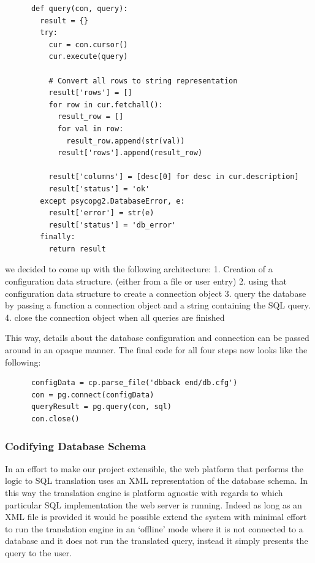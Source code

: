 \documentclass[a4paper, 11pt]{article}
\begin{document}
      \begin{verbatim}
      def query(con, query):
        result = {}
        try:
          cur = con.cursor()
          cur.execute(query)

          # Convert all rows to string representation
          result['rows'] = []
          for row in cur.fetchall():
            result_row = []
            for val in row:
              result_row.append(str(val))
            result['rows'].append(result_row)

          result['columns'] = [desc[0] for desc in cur.description]
          result['status'] = 'ok'
        except psycopg2.DatabaseError, e:
          result['error'] = str(e)
          result['status'] = 'db_error'
        finally:
          return result
      \end{verbatim}

      we decided to come up with the following architecture: 
      1. Creation of a configuration data structure. (either from a file or user
         entry)
      2. using that configuration data structure to create a connection object
      3. query the database by passing a function a connection object and a
      string containing the SQL query.
      4. close the connection object when all queries are finished

      This way, details about the database configuration and connection 
      can be passed around in an opaque manner. The final code for all four
      steps now looks like the following: 

      \begin{verbatim}
      configData = cp.parse_file('dbback end/db.cfg')
      con = pg.connect(configData)
      queryResult = pg.query(con, sql)
      con.close()
      \end{verbatim}

    \subsubsection{Codifying Database Schema}
      In an effort to make our project extensible, the web platform that performs 
      the logic to SQL translation uses an XML representation of the database
      schema. In this way the translation engine is platform agnostic with
      regards to which particular SQL implementation the web server is running.
      Indeed as long as an XML file is provided it would be possible extend the
      system with minimal effort to run the translation engine in an `offline' mode 
      where it is not connected to a database and it does not run the translated 
      query, instead it simply presents the query to the user.
\end{document}
